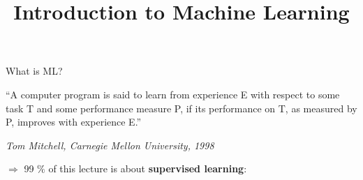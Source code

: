 \documentclass[11pt,compress,t,notes=noshow, xcolor=table]{beamer}
\title{Introduction to Machine Learning}
\date{}
\begin{document}
\sloppy


\begin{vbframe}{What is ML?}
    \item
    ``A computer program is said to learn from experience E with respect to
  some task T and some performance measure P, if its performance on T, as
  measured by P, improves with experience E.''\\
  \begin{footnotesize}
  \emph{Tom Mitchell, Carnegie Mellon University, 1998}\\
  \end{footnotesize}

\vspace{1ex}

$\Rightarrow$ 99 $\%$ of this lecture is about \textbf{supervised learning}:


\end{vbframe}
\end{document}
